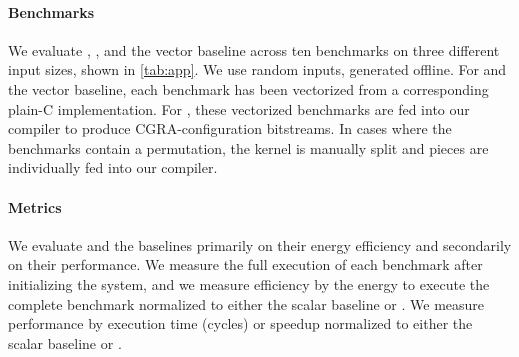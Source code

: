 \paragraph{Benchmarks}
We evaluate \snafuarch, \manic, and the vector baseline across ten benchmarks on three different input sizes, shown in \autoref{tab:app}.
%
We use random inputs, generated offline. 
% 
For \manic and the vector baseline, each benchmark has been vectorized from a corresponding plain-C implementation.
% 
For \snafuarch, these vectorized benchmarks are fed into our compiler to produce CGRA-configuration bitstreams.
% 
In cases where the benchmarks contain a permutation, the kernel is manually split and pieces are individually fed into our compiler.

\paragraph{Metrics}
%
We evaluate \snafuarch and the baselines primarily on their energy efficiency
and secondarily on their performance.
%
We measure the full execution of each benchmark after initializing the system, and we measure efficiency by the energy to execute the complete benchmark normalized to either the scalar baseline or \snafuarch.
%
We measure performance by execution time (cycles) or speedup normalized to either the scalar baseline or \snafuarch.
